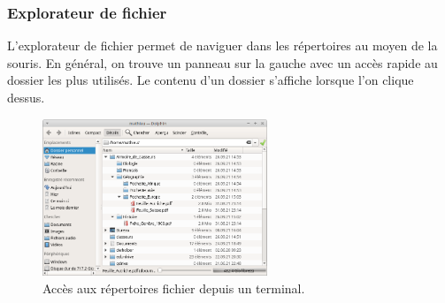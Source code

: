 \subsubsection{Explorateur de fichier}
L'explorateur de fichier permet de naviguer dans les répertoires au moyen de la souris. En général, on trouve un panneau sur la gauche avec un accès rapide au dossier les plus utilisés. Le contenu d'un dossier s'affiche lorsque l'on clique dessus. 
\begin{figure}[h!]
	\centering
	\includegraphics[trim=0 0 0 0,width=0.6\textwidth]{Images/OS/dolphin}
	\caption{Accès aux répertoires fichier depuis un terminal.}
\end{figure}
